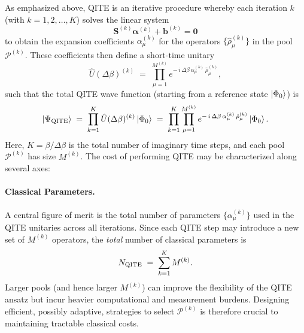 \documentclass[aip,jcp,amsmath,amssymb, reprint]{revtex4-1}
\begin{document}
As emphasized above, QITE is an iterative procedure whereby each iteration $k$ (with $k=1,2,\dots,K$) solves the linear system 
\begin{equation}
\label{eq:lin_sys_rep}
\mathbf{S}^{(k)} \boldsymbol{\alpha}^{(k)} + \mathbf{b}^{(k)} = \mathbf{0}
\end{equation}
to obtain the expansion coefficients $\alpha_\mu^{(k)}$ for the operators $\{\hat{\rho}_\mu^{(k)}\}$ in the pool $\mathcal{P}^{(k)}$. These coefficients then define a short-time unitary
\begin{equation}
\hat{U}(\Delta \beta)^{(k)} 
\;=\;
\prod_{\mu=1}^{M^{(k)}}
e^{-\,i \,\Delta \beta\,\alpha_\mu^{(k)} \,\hat{\rho}_\mu^{(k)}},
\end{equation}
such that the total QITE wave function (starting from a reference state $\ket{\Phi_0}$) is
\begin{equation}
\ket{\Psi_{\rm{QITE}}} 
\;=\;
\prod_{k=1}^{K}
\hat{U}(\Delta \beta)^{(k)} 
\ket{\Phi_0}
\;=\;
\prod_{k=1}^K
\prod_{\mu=1}^{M^{(k)}}
e^{-\,i\,\Delta \beta\,\alpha_\mu^{(k)} \,\hat{\rho}_\mu^{(k)}}
\ket{\Phi_0}.
\end{equation}
Here, $K = \beta/\Delta \beta$ is the total number of imaginary time steps, and each pool $\mathcal{P}^{(k)}$ has size $M^{(k)}$. The cost of performing QITE may be characterized along several axes:

\paragraph{Classical Parameters.}
A central figure of merit is the total number of parameters $\{\alpha_\mu^{(k)}\}$ used in the QITE unitaries across all iterations. Since each QITE step may introduce a new set of $M^{(k)}$ operators, the \textit{total} number of classical parameters is
\begin{equation}
N_{\rm{QITE}} 
\;=\;
\sum_{k=1}^{K} 
M^{(k)}.
\end{equation}
Larger pools (and hence larger $M^{(k)}$) can improve the flexibility of the QITE ansatz but incur heavier computational and measurement burdens. Designing efficient, possibly adaptive, strategies to select $\mathcal{P}^{(k)}$ is therefore crucial to maintaining tractable classical costs.
\end{document}
